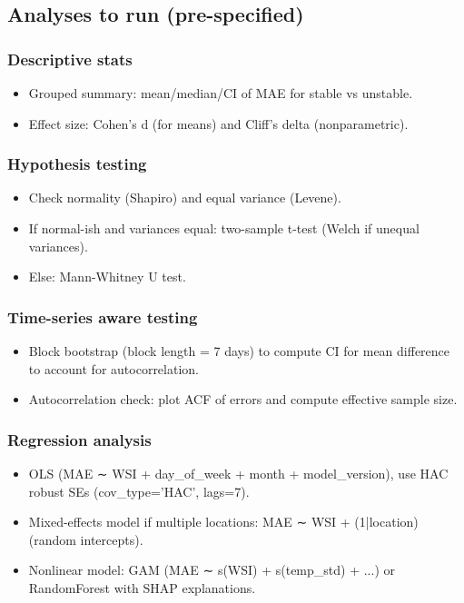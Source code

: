 \documentclass[11pt,a4paper]{article}
\begin{document}
\subsection{Analyses to run (pre-specified)}

\subsubsection{Descriptive stats}
\begin{itemize}
    \item Grouped summary: mean/median/CI of MAE for stable vs unstable.
    \item Effect size: Cohen's d (for means) and Cliff's delta (nonparametric).
\end{itemize}

\subsubsection{Hypothesis testing}
\begin{itemize}
    \item Check normality (Shapiro) and equal variance (Levene).
    \item If normal-ish and variances equal: two-sample t-test (Welch if unequal variances).
    \item Else: Mann-Whitney U test.
\end{itemize}

\subsubsection{Time-series aware testing}
\begin{itemize}
    \item Block bootstrap (block length = 7 days) to compute CI for mean difference to account for autocorrelation.
    \item Autocorrelation check: plot ACF of errors and compute effective sample size.
\end{itemize}

\subsubsection{Regression analysis}
\begin{itemize}
    \item OLS (MAE ∼ WSI + day\_of\_week + month + model\_version), use HAC robust SEs (cov\_type='HAC', lags=7).
    \item Mixed-effects model if multiple locations: MAE ∼ WSI + (1|location) (random intercepts).
    \item Nonlinear model: GAM (MAE ∼ s(WSI) + s(temp\_std) + ...) or RandomForest with SHAP explanations.
\end{itemize}
\end{document}
